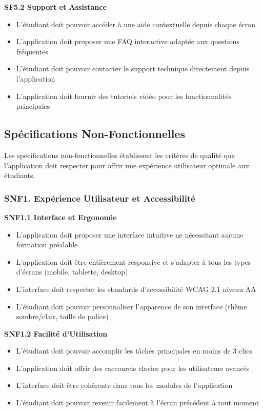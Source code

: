 \documentclass[12pt,a4paper]{report}
\begin{document}
\textbf{SF5.2 Support et Assistance}
\begin{itemize}
\item L'étudiant doit pouvoir accéder à une aide contextuelle depuis chaque écran
\item L'application doit proposer une FAQ interactive adaptée aux questions fréquentes
\item L'étudiant doit pouvoir contacter le support technique directement depuis l'application
\item L'application doit fournir des tutoriels vidéo pour les fonctionnalités principales
\end{itemize}

\subsection{Spécifications Non-Fonctionnelles}

Les spécifications non-fonctionnelles établissent les critères de qualité que l'application doit respecter pour offrir une expérience utilisateur optimale aux étudiants.

\subsubsection{SNF1. Expérience Utilisateur et Accessibilité}

\textbf{SNF1.1 Interface et Ergonomie}
\begin{itemize}
\item L'application doit proposer une interface intuitive ne nécessitant aucune formation préalable
\item L'application doit être entièrement responsive et s'adapter à tous les types d'écrans (mobile, tablette, desktop)
\item L'interface doit respecter les standards d'accessibilité WCAG 2.1 niveau AA
\item L'étudiant doit pouvoir personnaliser l'apparence de son interface (thème sombre/clair, taille de police)
\end{itemize}

\textbf{SNF1.2 Facilité d'Utilisation}
\begin{itemize}
\item L'étudiant doit pouvoir accomplir les tâches principales en moins de 3 clics
\item L'application doit offrir des raccourcis clavier pour les utilisateurs avancés
\item L'interface doit être cohérente dans tous les modules de l'application
\item L'étudiant doit pouvoir revenir facilement à l'écran précédent à tout moment
\end{itemize}
\end{document}
